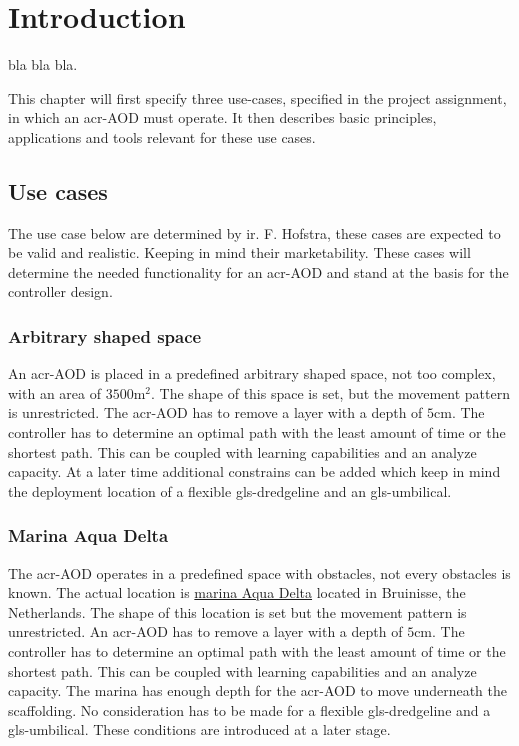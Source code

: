 \chapter{Introduction}\label{chap:Introduction}

bla bla bla.

 This chapter will first specify three use-cases, specified in the project assignment, in which an \gls{acr-AOD} must operate. It then describes basic principles, applications and tools relevant for these use cases.

\section{Use cases}\label{sec:usecases}
The use case below are determined by ir. F. Hofstra, these cases are expected to be valid and realistic. Keeping in mind their marketability. These cases will determine the needed functionality for an \gls{acr-AOD} and stand at the basis for the controller design.

\subsection{Arbitrary shaped space}\label{sec:usecase1}
An \gls{acr-AOD} is placed in a predefined arbitrary shaped space, not too complex, with an area of \( 3500 \si{\square\metre} \). The shape of this space is set, but the movement pattern is unrestricted. The \gls{acr-AOD} has to remove a layer with a depth of \( 5 \si{\cm} \). The controller has to determine an optimal path with the least amount of time or the shortest path. This can be coupled with learning capabilities and an analyze capacity. At a later time additional constrains can be added which keep in mind the deployment location of a flexible \gls{gls-dredgeline} and an \gls{gls-umbilical}.

\subsection{Marina Aqua Delta}\label{sec:usecase2}
The \gls{acr-AOD} operates in a predefined space with obstacles, not every obstacles is known. The actual location is \href{https://www.google.nl/maps/place/Jachthaven+Bruinisse/@51.6712838,4.0824101,15z/data=!4m2!3m1!1s0x0:0x9c840ab80bde39c8}{marina Aqua Delta} located in Bruinisse, the Netherlands. The shape of this location is set but the movement pattern is unrestricted. An \gls{acr-AOD}  has to remove a layer with a depth of \( 5 \si{\cm} \). The controller has to determine an optimal path with the least amount of time or the shortest path. This can be coupled with learning capabilities and an analyze capacity. The marina has enough depth for the \gls{acr-AOD} to move underneath the scaffolding.
No consideration has to be made for a flexible \gls{gls-dredgeline} and a \gls{gls-umbilical}. These conditions are introduced at a later stage.

